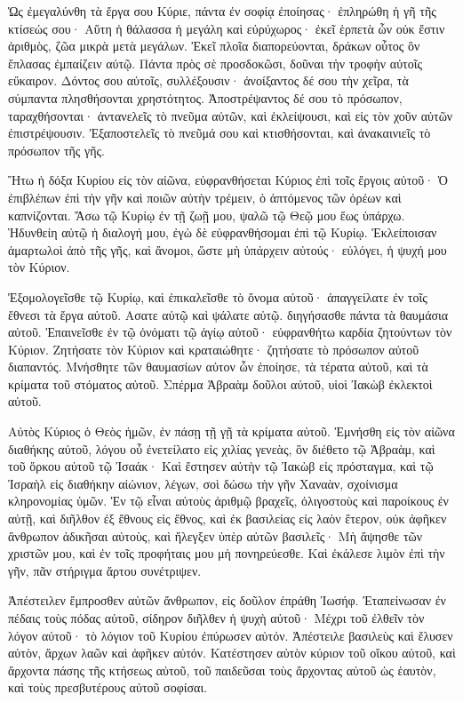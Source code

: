\begin{spacing}{1.1}
\begin{multicols}{2}
Ὡς ἐμεγαλύνθη τὰ ἔργα σου Κύριε, πάντα ἐν σοφίᾳ ἐποίησας· ἐπληρώθη ἡ γῆ τῆς κτίσεώς σου·
Αὕτη ἡ θάλασσα ἡ μεγάλη καὶ εὐρύχωρος· ἐκεῖ ἑρπετὰ ὧν οὐκ ἔστιν ἀριθμὸς, ζῶα μικρὰ μετὰ μεγάλων.
Ἐκεῖ πλοῖα διαπορεύονται, δράκων οὗτος ὃν ἔπλασας ἐμπαίζειν αὐτῷ.
Πάντα πρὸς σὲ προσδοκῶσι, δοῦναι τὴν τροφὴν αὐτοῖς εὔκαιρον.
Δόντος σου αὐτοῖς, συλλέξουσιν· ἀνοίξαντος δέ σου τὴν χεῖρα, τὰ σύμπαντα πλησθήσονται χρηστότητος.
Ἀποστρέψαντος δέ σου τὸ πρόσωπον, ταραχθήσονται· ἀντανελεῖς τὸ πνεῦμα αὐτῶν, καὶ ἐκλείψουσι, καὶ εἰς τὸν χοῦν αὐτῶν ἐπιστρέψουσιν.
Ἐξαποστελεῖς τὸ πνεῦμά σου καὶ κτισθήσονται, καὶ ἀνακαινιεῖς τὸ πρόσωπον τῆς γῆς.

Ἤτω ἡ δόξα Κυρίου εἰς τὸν αἰῶνα, εὐφρανθήσεται Κύριος ἐπὶ τοῖς ἔργοις αὐτοῦ·
Ὁ ἐπιβλέπων ἐπὶ τὴν γῆν καὶ ποιῶν αὐτὴν τρέμειν, ὁ ἁπτόμενος τῶν ὀρέων καὶ καπνίζονται.
Ἄσω τῷ Κυρίῳ ἐν τῇ ζωῇ μου, ψαλῶ τῷ Θεῷ μου ἕως ὑπάρχω.
Ἡδυνθείη αὐτῷ ἡ διαλογή μου, ἐγὼ δὲ εὐφρανθήσομαι ἐπὶ τῷ Κυρίῳ.
Ἐκλείποισαν ἁμαρτωλοὶ ἀπὸ τῆς γῆς, καὶ ἄνομοι, ὥστε μὴ ὑπάρχειν αὐτούς· εὐλόγει, ἡ ψυχή μου τὸν Κύριον.

Ἐξομολογεῖσθε τῷ Κυρίῳ, καὶ ἐπικαλεῖσθε τὸ ὄνομα αὐτοῦ· ἀπαγγείλατε ἐν τοῖς ἔθνεσι τὰ ἔργα αὐτοῦ.
Ασατε αὐτῷ καὶ ψάλατε αὐτῷ. διηγήσασθε πάντα τὰ θαυμάσια αὐτοῦ.
Ἐπαινεῖσθε ἐν τῷ ὀνόματι τῷ ἁγίῳ αὐτοῦ· εὐφρανθήτω καρδία ζητούντων τὸν Κύριον.
Ζητήσατε τὸν Κύριον καὶ κραταιώθητε· ζητήσατε τὸ πρόσωπον αὐτοῦ διαπαντός.
Μνήσθητε τῶν θαυμασίων αὐτον ὧν ἐποίησε, τὰ τέρατα αὐτοῦ, καὶ τὰ κρίματα τοῦ στόματος αὐτοῦ.
Σπέρμα Ἁβραὰμ δοῦλοι αὐτοῦ, υἱοὶ Ἰακὼβ ἐκλεκτοὶ αὐτοῦ.

Αὐτὸς Κύριος ὁ Θεὸς ἡμῶν, ἐν πάσῃ τῇ γῇ τὰ κρίματα αὐτοῦ.
Ἐμνήσθη εἰς τὸν αἰῶνα διαθήκης αὐτοῦ, λόγου οὗ ἐνετείλατο εἰς χιλίας γενεὰς,
ὃν διέθετο τῷ Ἁβραὰμ, καὶ τοῦ ὅρκου αὐτοῦ τῷ Ἰσαάκ·
Καὶ ἔστησεν αὐτὴν τῷ Ἰακὼβ εἰς πρόσταγμα, καὶ τῷ Ἰσραὴλ εἰς διαθήκην αἰώνιον,
λέγων, σοὶ δώσω τὴν γῆν Χαναὰν, σχοίνισμα κληρονομίας ὑμῶν.
Ἐν τῷ εἶναι αὐτοὺς ἀριθμῷ βραχεῖς, ὀλιγοστοὺς καὶ παροίκους ἐν αὐτῇ,
καὶ διῆλθον ἐξ ἔθνους εἰς ἔθνος, καὶ ἐκ βασιλείας εἰς λαὸν ἕτερον,
οὐκ ἀφῆκεν ἄνθρωπον ἀδικῆσαι αὐτοὺς, καὶ ἤλεγξεν ὑπὲρ αὐτῶν βασιλεῖς·
Μὴ ἅψησθε τῶν χριστῶν μου, καὶ ἐν τοῖς προφήταις μου μὴ πονηρεύεσθε.
Καὶ ἐκάλεσε λιμὸν ἐπὶ τὴν γῆν, πᾶν στήριγμα ἄρτου συνέτριψεν.

Ἀπέστειλεν ἔμπροσθεν αὐτῶν ἄνθρωπον, εἰς δοῦλον ἐπράθη Ἰωσήφ.
Ἐταπείνωσαν ἐν πέδαις τοὺς πόδας αὐτοῦ, σίδηρον διῆλθεν ἡ ψυχὴ αὐτοῦ·
Μέχρι τοῦ ἐλθεῖν τὸν λόγον αὐτοῦ· τὸ λόγιον τοῦ Κυρίου ἐπύρωσεν αὐτόν.
Ἀπέστειλε βασιλεὺς καὶ ἔλυσεν αὐτὸν, ἄρχων λαῶν καὶ ἀφῆκεν αὐτόν.
Κατέστησεν αὐτὸν κύριον τοῦ οἴκου αὐτοῦ, καὶ ἄρχοντα πάσης τῆς κτήσεως αὐτοῦ,
τοῦ παιδεῦσαι τοὺς ἄρχοντας αὐτοῦ ὡς ἑαυτὸν, καὶ τοὺς πρεσβυτέρους αὐτοῦ σοφίσαι.


\end{multicols}
\end{spacing}
